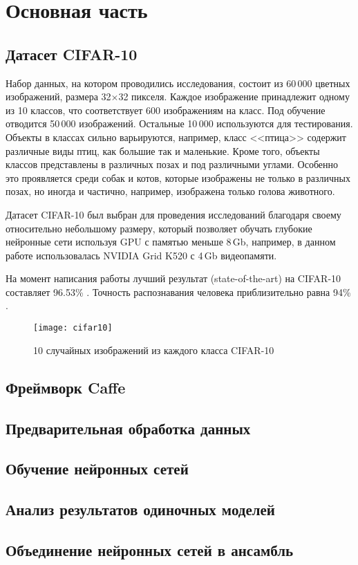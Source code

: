 \section{Основная часть}
\subsection{Датасет CIFAR-10}
Набор данных, на котором проводились исследования, состоит из 60\,000 цветных изображений, размера 
32$\times$32 пикселя. Каждое изображение принадлежит одному из 10 классов, что соответствует 600 изображениям на класс. Под 
обучение отводится 50\,000 изображений. Остальные 10\,000 используются для тестирования. Объекты в классах сильно варьируются, 
например, класс <<птица>> содержит различные виды птиц, как большие так и маленькие. Кроме того, объекты классов представлены в 
различных позах и под различными углами. Особенно это проявляется среди собак и котов, которые изображены не только в различных 
позах, но иногда и частично, например, изображена только голова животного.

Датасет CIFAR-10 был выбран для проведения исследований благодаря своему относительно небольшому размеру, который позволяет 
обучать глубокие нейронные сети используя GPU с памятью меньше 8\,Gb, например, в данном работе использовалась NVIDIA Grid K520 с 
4\,Gb видеопамяти.

На момент написания работы лучший результат (state-of-the-art) на CIFAR-10 составляет 96.53\% \cite{2014arXiv1412}. Точность 
распознавания человека приблизительно равна 94\% \cite{karpathycifar}.

\begin{figure}[h]
\centering
\texttt{[image: cifar10]}
\caption{10 случайных изображений из каждого класса CIFAR-10}
\end{figure}

\subsection{Фреймворк Caffe}
\subsection{Предварительная обработка данных}
\subsection{Обучение нейронных сетей}
\subsection{Анализ результатов одиночных моделей}
\subsection{Объединение нейронных сетей в ансамбль}